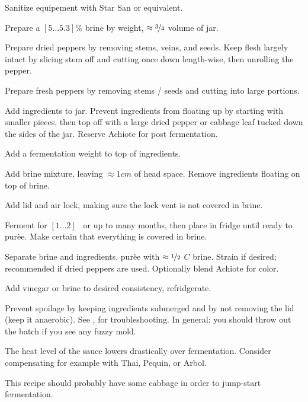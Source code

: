 \begin{preparation}
\item Sanitize equipement with Star San or equivalent.

\item Prepare a $[5 \dots 5.3]\%$ brine by weight, $\approx\nicefrac{3}{4}$ volume of jar.

\item Prepare dried peppers by removing stems, veins, and seeds. Keep flesh largely intact by slicing stem off and cutting once down length-wise, then unrolling the pepper.

\item Prepare fresh peppers by removing stems / seeds and cutting into large portions.

\item Add ingredients to jar.
	Prevent ingredients from floating up by starting with smaller pieces, then top off with a large dried pepper or cabbage leaf tucked down the sides of the jar.
	Reserve Achiote for post fermentation.

\item Add a fermentation weight to top of ingredients.

\item Add brine mixture, leaving $\approx1cm$ of head space.
	Remove ingredients floating on top of brine.

\item Add lid and air lock, making sure the lock vent is not covered in brine.

\item Ferment for $[1...2]$ \week~or up to many months, then place in fridge until ready to pur\`{e}e.
	Make certain that everything is covered in brine.

\item Separate brine and ingredients, pur\`{e}e with $\approx\nicefrac{1}{2}$ $C$ brine.
	Strain if desired; recommended if dried peppers are used.
	Optionally blend Achiote for color.

\item Add vinegar or brine to desired consistency, refridgerate.
\end{preparation}


\begin{experiments}
\item Prevent spoilage by keeping ingredients submerged and by not removing the lid (keep it anaerobic).
	See  \cite{fieryferments2017},
for troubleshooting.
	In general: you should throw out the batch if you see any fuzzy mold.
\item The heat level of the sauce lowers drastically over fermentation.
	Consider compensating for example with Thai, Pequin, or Arbol.
\item This recipe should probably have some cabbage in order to jump-start fermentation.
\end{experiments}


\recipeend
